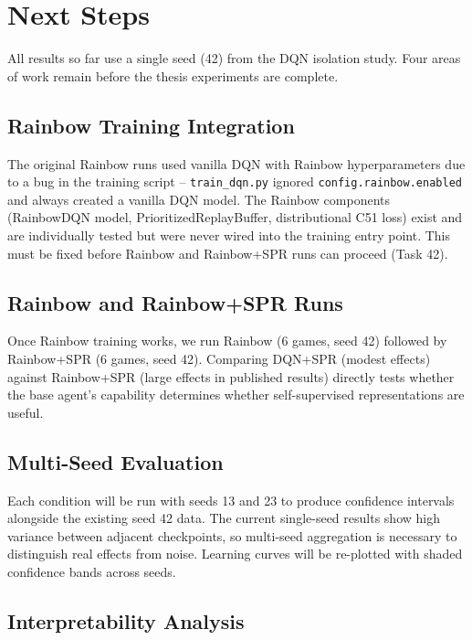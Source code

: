 \documentclass[11pt]{article}
\begin{document}
\section{Next Steps}

All results so far use a single seed (42) from the DQN isolation study.
Four areas of work remain before the thesis experiments are complete.

\subsection{Rainbow Training Integration}

The original Rainbow runs used vanilla DQN with Rainbow hyperparameters
due to a bug in the training script -- \texttt{train\_dqn.py} ignored
\texttt{config.rainbow.enabled} and always created a vanilla DQN model.
The Rainbow components (RainbowDQN model, PrioritizedReplayBuffer,
distributional C51 loss) exist and are individually tested but were
never wired into the training entry point. This must be fixed before
Rainbow and Rainbow+SPR runs can proceed (Task 42).

\subsection{Rainbow and Rainbow+SPR Runs}

Once Rainbow training works, we run Rainbow (6 games, seed 42) followed
by Rainbow+SPR (6 games, seed 42). Comparing DQN+SPR (modest effects)
against Rainbow+SPR (large effects in published results) directly tests
whether the base agent's capability determines whether self-supervised
representations are useful.

\subsection{Multi-Seed Evaluation}

Each condition will be run with seeds 13 and 23 to produce confidence
intervals alongside the existing seed 42 data. The current single-seed
results show high variance between adjacent checkpoints, so multi-seed
aggregation is necessary to distinguish real effects from noise.
Learning curves will be re-plotted with shaded confidence bands across
seeds.

\subsection{Interpretability Analysis}
\end{document}
